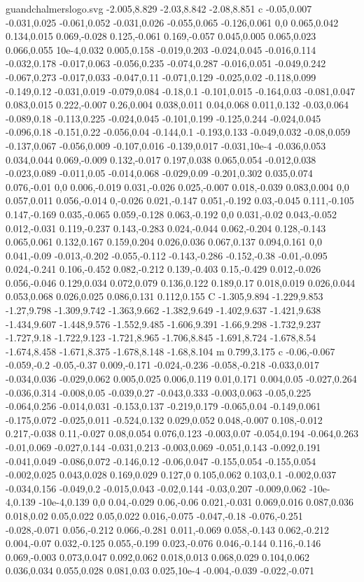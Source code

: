 \begin{filecontents}[noheader]{guandchalmerslogo.svg}
-2.005,8.829 -2.03,8.842 -2.08,8.851 c -0.05,0.007 -0.031,0.025 -0.061,0.052 -0.031,0.026 -0.055,0.065 -0.126,0.061 0,0 0.065,0.042 0.134,0.015 0.069,-0.028 0.125,-0.061 0.169,-0.057 0.045,0.005 0.065,0.023 0.066,0.055 10e-4,0.032 0.005,0.158 -0.019,0.203 -0.024,0.045 -0.016,0.114 -0.032,0.178 -0.017,0.063 -0.056,0.235 -0.074,0.287 -0.016,0.051 -0.049,0.242 -0.067,0.273 -0.017,0.033 -0.047,0.11 -0.071,0.129 -0.025,0.02 -0.118,0.099 -0.149,0.12 -0.031,0.019 -0.079,0.084 -0.18,0.1 -0.101,0.015 -0.164,0.03 -0.081,0.047 0.083,0.015 0.222,-0.007 0.26,0.004 0.038,0.011 0.04,0.068 0.011,0.132 -0.03,0.064 -0.089,0.18 -0.113,0.225 -0.024,0.045 -0.101,0.199 -0.125,0.244 -0.024,0.045 -0.096,0.18 -0.151,0.22 -0.056,0.04 -0.144,0.1 -0.193,0.133 -0.049,0.032 -0.08,0.059 -0.137,0.067 -0.056,0.009 -0.107,0.016 -0.139,0.017 -0.031,10e-4 -0.036,0.053 0.034,0.044 0.069,-0.009 0.132,-0.017 0.197,0.038 0.065,0.054 -0.012,0.038 -0.023,0.089 -0.011,0.05 -0.014,0.068 -0.029,0.09 -0.201,0.302 0.035,0.074 0.076,-0.01 0,0 0.006,-0.019 0.031,-0.026 0.025,-0.007 0.018,-0.039 0.083,0.004 0,0 0.057,0.011 0.056,-0.014 0,-0.026 0.021,-0.147 0.051,-0.192 0.03,-0.045 0.111,-0.105 0.147,-0.169 0.035,-0.065 0.059,-0.128 0.063,-0.192 0,0 0.031,-0.02 0.043,-0.052 0.012,-0.031 0.119,-0.237 0.143,-0.283 0.024,-0.044 0.062,-0.204 0.128,-0.143 0.065,0.061 0.132,0.167 0.159,0.204 0.026,0.036 0.067,0.137 0.094,0.161 0,0 0.041,-0.09 -0.013,-0.202 -0.055,-0.112 -0.143,-0.286 -0.152,-0.38 -0.01,-0.095 0.024,-0.241 0.106,-0.452 0.082,-0.212 0.139,-0.403 0.15,-0.429 0.012,-0.026 0.056,-0.046 0.129,0.034 0.072,0.079 0.136,0.122 0.189,0.17 0.018,0.019 0.026,0.044 0.053,0.068 0.026,0.025 0.086,0.131 0.112,0.155 C -1.305,9.894 -1.229,9.853 -1.27,9.798 -1.309,9.742 -1.363,9.662 -1.382,9.649 -1.402,9.637 -1.421,9.638 -1.434,9.607 -1.448,9.576 -1.552,9.485 -1.606,9.391 -1.66,9.298 -1.732,9.237 -1.727,9.18 -1.722,9.123 -1.721,8.965 -1.706,8.845 -1.691,8.724 -1.678,8.54 -1.674,8.458 -1.671,8.375 -1.678,8.148 -1.68,8.104 m 0.799,3.175 c -0.06,-0.067 -0.059,-0.2 -0.05,-0.37 0.009,-0.171 -0.024,-0.236 -0.058,-0.218 -0.033,0.017 -0.034,0.036 -0.029,0.062 0.005,0.025 0.006,0.119 0.01,0.171 0.004,0.05 -0.027,0.264 -0.036,0.314 -0.008,0.05 -0.039,0.27 -0.043,0.333 -0.003,0.063 -0.05,0.225 -0.064,0.256 -0.014,0.031 -0.153,0.137 -0.219,0.179 -0.065,0.04 -0.149,0.061 -0.175,0.072 -0.025,0.011 -0.524,0.132 0.029,0.052 0.048,-0.007 0.108,-0.012 0.217,-0.038 0.11,-0.027 0.08,0.054 0.076,0.123 -0.003,0.07 -0.054,0.194 -0.064,0.263 -0.01,0.069 -0.027,0.144 -0.031,0.213 -0.003,0.069 -0.051,0.143 -0.092,0.191 -0.041,0.049 -0.086,0.072 -0.146,0.12 -0.06,0.047 -0.155,0.054 -0.155,0.054 -0.002,0.025 0.043,0.028 0.169,0.029 0.127,0 0.105,0.062 0.103,0.1 -0.002,0.037 -0.034,0.156 -0.049,0.2 -0.015,0.043 -0.02,0.144 -0.03,0.207 -0.009,0.062 -10e-4,0.139 -10e-4,0.139 0,0 0.04,-0.029 0.06,-0.06 0.021,-0.031 0.069,0.016 0.087,0.036 0.018,0.02 0.05,0.022 0.05,0.022 0.016,-0.075 -0.047,-0.18 -0.076,-0.251 -0.028,-0.071 0.056,-0.212 0.066,-0.281 0.011,-0.069 0.058,-0.143 0.062,-0.212 0.004,-0.07 0.032,-0.125 0.055,-0.199 0.023,-0.076 0.046,-0.144 0.116,-0.146 0.069,-0.003 0.073,0.047 0.092,0.062 0.018,0.013 0.068,0.029 0.104,0.062 0.036,0.034 0.055,0.028 0.081,0.03 0.025,10e-4 -0.004,-0.039 -0.022,-0.071 
\end{filecontents}
